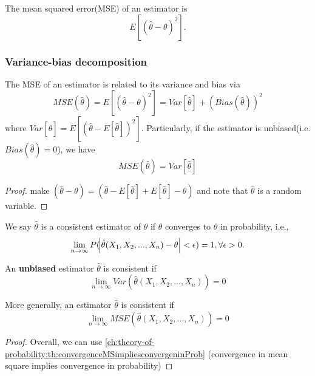 \begin{refsection}
\begin{definition}
The mean squared error(MSE) of an estimator is $$E[(\hat{\theta}-\theta)^2].$$
\end{definition}





\subsubsection{Variance-bias decomposition}
\begin{theorem}
The MSE of an estimator is related to its variance and bias via
\begin{equation}
 MSE(\hat{\theta}) = E[(\hat{\theta}-\theta)^2]=Var[\hat{\theta}] + (Bias(\hat{\theta}))^2
\end{equation}
where $Var[\hat{\theta}] = E[(\hat{\theta} - E[\hat{\theta}])^2]$. Particularly, if the estimator is unbiased(i.e. $Bias(\hat{\theta}) = 0$), we have
$$MSE(\hat{\theta}) =Var[\hat{\theta}]$$
\end{theorem}
\begin{proof}
make $(\hat{\theta}-\theta) = (\hat{\theta}-E[\hat{\theta}] + E[\hat{\theta}] - \theta)$ and note that $\hat{\theta}$ is a random variable.	
\end{proof}
 

\begin{definition}
We say $\hat{\theta}$ is a consistent estimator of $\theta$ if $\hat{\theta}$ converges to $\theta$ in probability, i.e., 
$$\lim_{n\to \infty} P(\abs{\hat{\theta}(X_1,X_2,...,X_n)-\theta} < \epsilon) = 1,\forall \epsilon > 0.$$
\end{definition}

\begin{theorem}
An \textbf{unbiased} estimator $\hat{\theta}$ is consistent if $$\lim_{n\to \infty} Var(\hat{\theta}(X_1,X_2,...,X_n)) = 0$$

More generally, an estimator $\hat{\theta}$ is consistent if $$\lim_{n\to \infty} MSE(\hat{\theta}(X_1,X_2,...,X_n)) = 0$$

\end{theorem}
\begin{proof}
Overall, we can use \autoref{ch:theory-of-probability:th:convergenceMSimpliesconvergeninProb} (convergence in mean square implies convergence in probability)

\end{proof}
 

\end{refsection}
